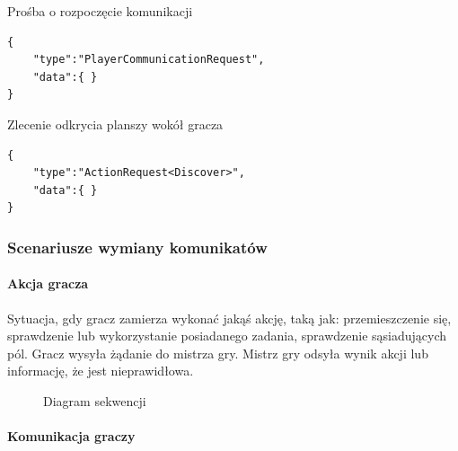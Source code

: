 \documentclass[11pt]{article}
\let\Oldsubsubsection\subsubsection
\renewcommand{\subsubsection}{\FloatBarrier\Oldsubsubsection}
\begin{document}
\begin{json}
\caption{Prośba o rozpoczęcie komunikacji}
\begin{lstlisting}
{ 
	"type":"PlayerCommunicationRequest",
	"data":{ }
}
\end{lstlisting}
\end{json}

\begin{json}
\caption{Zlecenie odkrycia planszy wokół gracza}
\begin{lstlisting}
{ 
	"type":"ActionRequest<Discover>",
	"data":{ }
}
\end{lstlisting}
\end{json}

\subsubsection{Scenariusze wymiany komunikatów}

\paragraph{Akcja gracza}

Sytuacja, gdy gracz zamierza wykonać jakąś akcję, taką jak: przemieszczenie się, sprawdzenie lub wykorzystanie posiadanego zadania, sprawdzenie sąsiadujących pól.
Gracz wysyła żądanie do mistrza gry. Mistrz gry odsyła wynik akcji lub informację, że jest nieprawidłowa.

\begin{figure}[!h]
	\centering
	\caption{Diagram sekwencji}
		\hspace*{-2cm}
\end{figure}
\FloatBarrier

\newpage

\paragraph{Komunikacja graczy}
\end{document}
